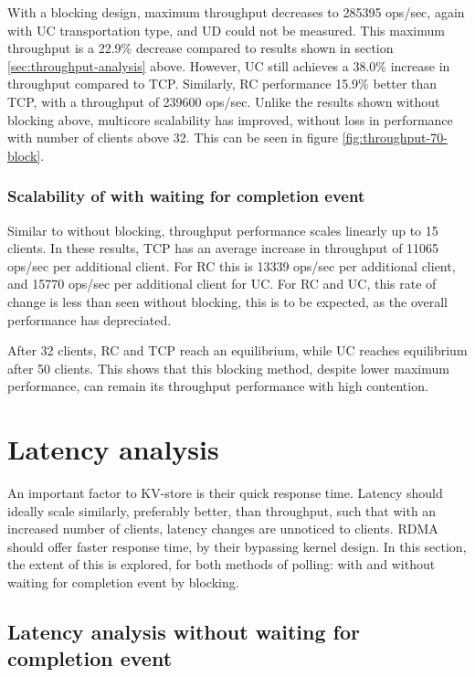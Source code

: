 With a blocking design, maximum throughput decreases to 285395 ops/sec, again with UC transportation type, and UD could not be measured.
This maximum throughput is a 22.9\% decrease compared to results shown in section \ref{sec:throughput-analysis} above.
However, UC still achieves a 38.0\% increase in throughput compared to TCP.
Similarly, RC performance 15.9\% better than TCP, with a throughput of 239600 ops/sec.
Unlike the results shown without blocking above, multicore scalability has improved, without loss in performance with number of clients above 32.
This can be seen in figure \ref{fig:throughput-70-block}.

\subsubsection{Scalability of with waiting for completion event}
Similar to without blocking, throughput performance scales linearly up to 15 clients.
In these results, TCP has an average increase in throughput of 11065 ops/sec per additional client.
For RC this is 13339 ops/sec per additional client, and 15770 ops/sec per additional client for UC.
For RC and UC, this rate of change is less than seen without blocking, this is to be expected, as the overall performance has depreciated.

After 32 clients, RC and TCP reach an equilibrium, while UC reaches equilibrium after 50 clients.
This shows that this blocking method, despite lower maximum performance, can remain its throughput performance with high contention.


\section{Latency analysis}\label{sec:latency:analysis}
An important factor to KV-store is their quick response time.
Latency should ideally scale similarly, preferably better, than throughput, such that with an increased number of clients, latency changes are unnoticed to clients.
RDMA should offer faster response time, by their bypassing kernel design.
In this section, the extent of this is explored, for both methods of polling: with and without waiting for completion event by blocking.

\subsection{Latency analysis without waiting for completion event}

